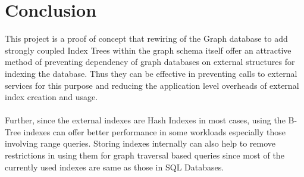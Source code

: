 
\chapter{Conclusion} %

\label{Chapter 8} %

This project is a proof of concept that rewiring of the Graph database to add strongly coupled Index Trees within the graph schema itself offer an attractive method of preventing dependency of graph databases on external structures for indexing the database. Thus they can be effective in preventing calls to external services for this purpose and reducing the application level overheads of external index creation and usage.\\
\\
Further, since the external indexes are Hash Indexes in most cases, using the B-Tree indexes can offer better performance in some workloads especially those involving range queries. Storing indexes internally can also help to remove restrictions in using them for graph traversal based queries since most of the currently used indexes are same as those in SQL Databases.

